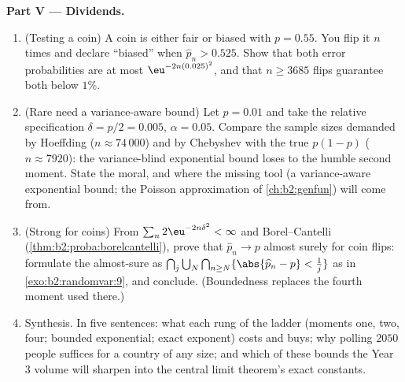 \begin{problem}
\medskip
\noindent\textbf{Part V --- Dividends.}
\begin{enumerate}[resume]
  \item (Testing a coin) A coin is either fair or biased with
        $p = 0.55$. You flip it $n$ times and declare
        ``biased'' when $\widehat p_n > 0.525$. Show that
        both error probabilities are at most
        $\eu^{-2n(0.025)^2}$, and that $n \geq 3685$ flips
        guarantee both below $1\%$.
  \item (Rare  need a variance-aware bound) Let $p =
        0.01$ and take the relative specification $\delta =
        p/2 = 0.005$, $\alpha = 0.05$. Compare the sample
        sizes demanded by Hoeffding ($n \approx 74\,000$) and
        by Chebyshev with the true  $p(1-p)$ ($n
        \approx 7920$): the variance-blind exponential bound
        loses to the humble second moment. State the moral,
        and where the missing tool (a variance-aware
        exponential bound; the Poisson approximation of
        \cref{ch:b2:genfun}) will come from.
  \item (Strong  for coins) From $\sum_n
        2\eu^{-2n\delta^2} < \infty$ and Borel--Cantelli
        (\cref{thm:b2:proba:borelcantelli}), prove that
        $\widehat p_n \to p$ almost surely for 
        coin flips: formulate the almost-sure  as
        $\bigcap_j\bigcup_N\bigcap_{n\geq N}
        \{\abs{\widehat p_n - p} < \tfrac1j\}$ as in
        \cref{exo:b2:randomvar:9}, and conclude. (Boundedness
        replaces the fourth moment used there.)
  \item Synthesis. In five sentences: what each rung of the
        ladder (moments one, two, four; bounded exponential;
        exact exponent) costs and buys; why polling $2050$
        people suffices for a country of any size; and which
        of these bounds the Year 3 volume will sharpen into
        the central limit theorem's exact constants.
\end{enumerate}
\end{problem}
